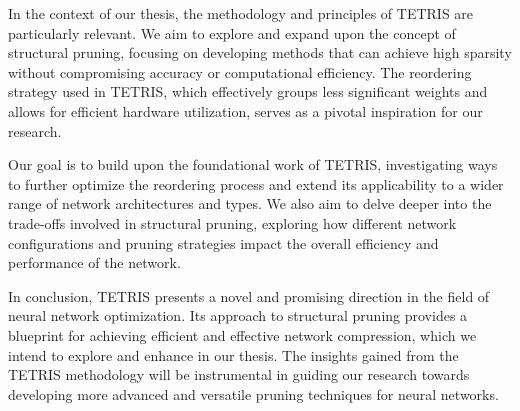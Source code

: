 In the context of our thesis, the methodology and principles of TETRIS are particularly relevant. We aim to explore and expand upon the concept of structural pruning, focusing on developing methods that can achieve high sparsity without compromising accuracy or computational efficiency. The reordering strategy used in TETRIS, which effectively groups less significant weights and allows for efficient hardware utilization, serves as a pivotal inspiration for our research.

Our goal is to build upon the foundational work of TETRIS, investigating ways to further optimize the reordering process and extend its applicability to a wider range of network architectures and types. We also aim to delve deeper into the trade-offs involved in structural pruning, exploring how different network configurations and pruning strategies impact the overall efficiency and performance of the network.

In conclusion, TETRIS presents a novel and promising direction in the field of neural network optimization. Its approach to structural pruning provides a blueprint for achieving efficient and effective network compression, which we intend to explore and enhance in our thesis. The insights gained from the TETRIS methodology will be instrumental in guiding our research towards developing more advanced and versatile pruning techniques for neural networks.
